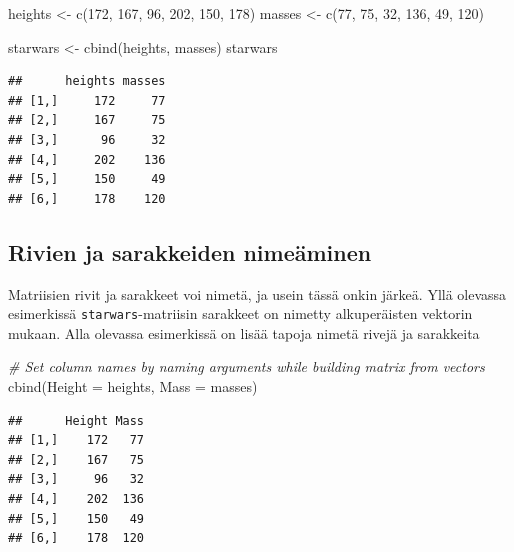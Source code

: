 \documentclass[
]{book}
\newenvironment{Shaded}{\begin{snugshade}}{\end{snugshade}}
\newcommand{\AttributeTok}[1]{\textcolor[rgb]{0.77,0.63,0.00}{#1}}
\newcommand{\CommentTok}[1]{\textcolor[rgb]{0.56,0.35,0.01}{\textit{#1}}}
\newcommand{\DecValTok}[1]{\textcolor[rgb]{0.00,0.00,0.81}{#1}}
\newcommand{\FunctionTok}[1]{\textcolor[rgb]{0.00,0.00,0.00}{#1}}
\newcommand{\NormalTok}[1]{#1}
\newcommand{\OtherTok}[1]{\textcolor[rgb]{0.56,0.35,0.01}{#1}}
\begin{document}
\begin{Shaded}
\begin{Highlighting}[]
\NormalTok{heights }\OtherTok{\textless{}{-}} \FunctionTok{c}\NormalTok{(}\DecValTok{172}\NormalTok{, }\DecValTok{167}\NormalTok{, }\DecValTok{96}\NormalTok{, }\DecValTok{202}\NormalTok{, }\DecValTok{150}\NormalTok{, }\DecValTok{178}\NormalTok{)}
\NormalTok{masses }\OtherTok{\textless{}{-}} \FunctionTok{c}\NormalTok{(}\DecValTok{77}\NormalTok{, }\DecValTok{75}\NormalTok{, }\DecValTok{32}\NormalTok{, }\DecValTok{136}\NormalTok{, }\DecValTok{49}\NormalTok{, }\DecValTok{120}\NormalTok{)}

\NormalTok{starwars }\OtherTok{\textless{}{-}} \FunctionTok{cbind}\NormalTok{(heights, masses)}
\NormalTok{starwars}
\end{Highlighting}
\end{Shaded}

\begin{verbatim}
##      heights masses
## [1,]     172     77
## [2,]     167     75
## [3,]      96     32
## [4,]     202    136
## [5,]     150     49
## [6,]     178    120
\end{verbatim}

\hypertarget{rivien-ja-sarakkeiden-nimeuxe4minen}{%
\subsection{Rivien ja sarakkeiden nimeäminen}\label{rivien-ja-sarakkeiden-nimeuxe4minen}}

Matriisien rivit ja sarakkeet voi nimetä, ja usein tässä onkin järkeä. Yllä olevassa esimerkissä \texttt{starwars}-matriisin sarakkeet on nimetty alkuperäisten vektorin mukaan. Alla olevassa esimerkissä on lisää tapoja nimetä rivejä ja sarakkeita

\begin{Shaded}
\begin{Highlighting}[]
\CommentTok{\# Set column names by naming arguments while building matrix from vectors}
\FunctionTok{cbind}\NormalTok{(}\AttributeTok{Height =}\NormalTok{ heights, }\AttributeTok{Mass =}\NormalTok{ masses)}
\end{Highlighting}
\end{Shaded}

\begin{verbatim}
##      Height Mass
## [1,]    172   77
## [2,]    167   75
## [3,]     96   32
## [4,]    202  136
## [5,]    150   49
## [6,]    178  120
\end{verbatim}
\end{document}
